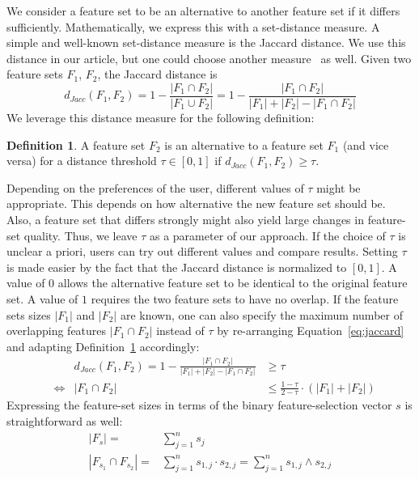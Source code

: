 \documentclass{article}
\theoremstyle{definition}
\newtheorem{definition}{Definition}
\begin{document}
We consider a feature set to be an alternative to another feature set if it differs sufficiently.
Mathematically, we express this with a set-distance measure.
A simple and well-known set-distance measure is the Jaccard distance.
We use this distance in our article, but one could choose another measure~\cite{egghe2009new} as well.
Given two feature sets $F_1$, $F_2$, the Jaccard distance is
%
\begin{equation}
	d_{Jacc}(F_1,F_2) = 1 - \frac{|F_1 \cap F_2|}{|F_1 \cup F_2|} = 1 - \frac{|F_1 \cap F_2|}{|F_1| + |F_2| - |F_1 \cap F_2|}
	\label{eq:jaccard}
\end{equation}
%
We leverage this distance measure for the following definition:
%
\begin{definition}
	A feature set $F_2$ is an alternative to a feature set $F_1$ (and vice versa) for a distance threshold $\tau \in [0,1]$ if $d_{Jacc}(F_1,F_2) \geq \tau$.
	\label{def:single-alternative}
\end{definition}
%
Depending on the preferences of the user, different values of $\tau$ might be appropriate.
This depends on how alternative the new feature set should be.
Also, a feature set that differs strongly might also yield large changes in feature-set quality.
Thus, we leave $\tau$ as a parameter of our approach.
If the choice of $\tau$ is unclear a priori, users can try out different values and compare results.
Setting $\tau$ is made easier by the fact that the Jaccard distance is normalized to $[0,1]$.
A value of $0$ allows the alternative feature set to be identical to the original feature set.
A value of $1$ requires the two feature sets to have no overlap.
If the feature sets sizes $|F_1|$ and $|F_2|$ are known, one can also specify the maximum number of overlapping features $|F_1 \cap F_2|$ instead of $\tau$ by re-arranging Equation~\ref{eq:jaccard} and adapting Definition~\ref{def:single-alternative} accordingly:
%
\begin{align}
	& & d_{Jacc}(F_1,F_2) = 1 - \frac{|F_1 \cap F_2|}{|F_1| + |F_2| - |F_1 \cap F_2|} &\geq \tau \nonumber \\
	&\Leftrightarrow & |F_1 \cap F_2| &\leq \frac{1 - \tau}{2 - \tau} \cdot (|F_1| + |F_2|)
	\label{eq:jaccard-rearranged}
\end{align}
%
Expressing the feature-set sizes in terms of the binary feature-selection vector $s$ is straightforward as well:
%
\begin{align}
	|F_s| =& \sum_{j=1}^n s_j \nonumber \\
	|F_{s_1} \cap F_{s_2}| =& \sum_{j=1}^n s_{1,j} \cdot s_{2,j} = \sum_{j=1}^n s_{1,j} \land s_{2,j}
	\label{eq:feature-set-size}
\end{align}
%
\end{document}
